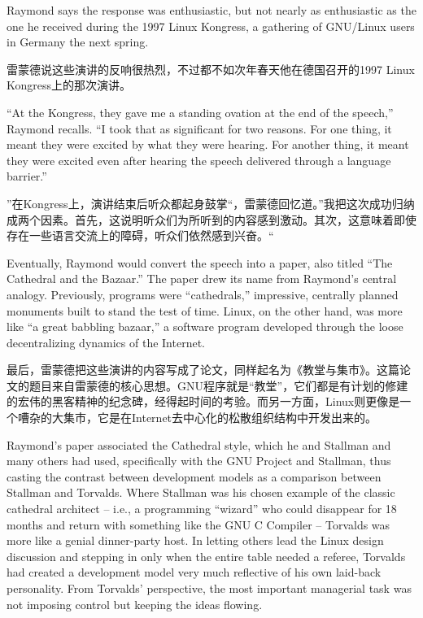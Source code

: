 \ifdefined\eng
Raymond says the response was enthusiastic, but not nearly as enthusiastic as the one he received during the 1997 Linux Kongress, a gathering of GNU/Linux users in Germany the next spring.
\fi

\ifdefined\chs
雷蒙德说这些演讲的反响很热烈，不过都不如次年春天他在德国召开的1997 Linux Kongress上的那次演讲。
\fi

\ifdefined\eng
``At the Kongress, they gave me a standing ovation at the end of the speech,'' Raymond recalls. ``I took that as significant for two reasons. For one thing, it meant they were excited by what they were hearing. For another thing, it meant they were excited even after hearing the speech delivered through a language barrier.''
\fi

\ifdefined\chs
''在Kongress上，演讲结束后听众都起身鼓掌``，雷蒙德回忆道。''我把这次成功归纳成两个因素。首先，这说明听众们为所听到的内容感到激动。其次，这意味着即使存在一些语言交流上的障碍，听众们依然感到兴奋。``
\fi

\ifdefined\eng
Eventually, Raymond would convert the speech into a paper, also titled ``The Cathedral and the Bazaar.'' The paper drew its name from Raymond's central analogy. Previously, programs were ``cathedrals,'' impressive, centrally planned monuments built to stand the test of time. Linux, on the other hand, was more like ``a great babbling bazaar,'' a software program developed through the loose decentralizing dynamics of the Internet.
\fi

\ifdefined\chs
最后，雷蒙德把这些演讲的内容写成了论文，同样起名为《教堂与集市》。这篇论文的题目来自雷蒙德的核心思想。GNU程序就是``教堂''，它们都是有计划的修建的宏伟的黑客精神的纪念碑，经得起时间的考验。而另一方面，Linux则更像是一个嘈杂的大集市，它是在Internet去中心化的松散组织结构中开发出来的。
\fi

\ifdefined\eng
Raymond's paper associated the Cathedral style, which he and Stallman and many others had used, specifically with the GNU Project and Stallman, thus casting the contrast between development models as a comparison between Stallman and Torvalds. Where Stallman was his chosen example of the classic cathedral architect -- i.e., a programming ``wizard'' who could disappear for 18 months and return with something like the GNU C Compiler -- Torvalds was more like a genial dinner-party host. In letting others lead the Linux design discussion and stepping in only when the entire table needed a referee, Torvalds had created a development model very much reflective of his own laid-back personality. From Torvalds' perspective, the most important managerial task was not imposing control but keeping the ideas flowing.
\fi

